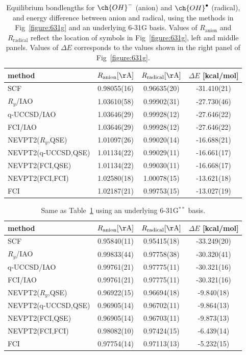 \documentclass[aps,pra,twocolumn]{revtex4-2}
\newcommand{\OHradical}{\ch{OH}^\bullet}
\newcommand{\OHanion}{\ch{OH}^-}
\begin{document}
 
\begin{table}[t!]
\begin{tabular}{lccc}
\hline\hline
method & $R_{\mathrm{anion}} [\mathrm{\AA}]$ & $R_{\mathrm{radical}} [\mathrm{\AA}]$ & $\Delta E$ [kcal/mol] \\ \hline
SCF & 0.98055(16) & 0.96635(20) & -31.410(21) \\ \hline
$R_y$/IAO & 1.03610(58) & 0.99902(31) & -27.730(46) \\
q-UCCSD/IAO & 1.03646(29) & 0.99928(12) & -27.646(22) \\
FCI/IAO & 1.03646(29) & 0.99928(12) & -27.646(22) \\ \hline
NEVPT2($R_y$,QSE) & 1.01097(26) & 0.99020(14) & -16.688(21) \\
NEVPT2(q-UCCSD,QSE) & 1.01134(22) & 0.99029(11) & -16.661(17) \\
NEVPT2(FCI,QSE) & 1.01134(22) & 0.99030(11) & -16.668(17) \\
NEVPT2(FCI,FCI) & 1.02580(18) & 1.00078(15) & -13.621(18) \\ \hline
FCI & 1.02187(21) & 0.99753(15) & -13.027(19) \\
\hline\hline
\end{tabular}
\caption{Equilibrium bondlengths for $\OHanion$ (anion) and  $\OHradical$ (radical), and energy difference between anion and radical, using the methods in Fig~\ref{figure:631g} and an underlying 6-31G basis.
Values of $R_{\mathrm{anion}}$ and $R_{\mathrm{radical}}$ reflect the location of symbols in Fig~\ref{figure:631g}, left and middle panels. 
Values of $\Delta E$ corresponds to the values shown in the right panel of Fig~\ref{figure:631g}.}
\label{tab:631g}
\end{table}


\begin{table}[t!]
\begin{tabular}{lccc}
\hline\hline
method & $R_{\mathrm{anion}} [\mathrm{\AA}]$ & $R_{\mathrm{radical}} [\mathrm{\AA}]$ & $\Delta E$ [kcal/mol] \\ \hline
SCF & 0.95840(11) & 0.95415(18) & -33.249(20) \\ \hline
$R_y$/IAO & 0.99833(44) & 0.97758(38) & -30.320(41) \\
q-UCCSD/IAO & 0.99761(21) & 0.97775(11) & -30.321(16) \\
FCI/IAO & 0.99761(21) & 0.97775(11) & -30.321(16) \\ \hline
NEVPT2($R_y$,QSE) & 0.96922(15) & 0.96694(18) & -9.840(18) \\
NEVPT2(q-UCCSD,QSE) & 0.96905(14) & 0.96702(11) & -9.864(13) \\
NEVPT2(FCI,QSE) & 0.96905(14) & 0.96703(11) & -9.873(13) \\
NEVPT2(FCI,FCI) & 0.98082(10) & 0.97424(15) & -6.439(14) \\ \hline
FCI & 0.97754(14) & 0.97113(13) & -5.232(15) \\
\hline\hline
\end{tabular}
\caption{Same as Table~\ref{tab:631g} using an underlying 6-31G${}^{**}$ basis.}
\label{tab:631gss}
\end{table}
\end{document}
